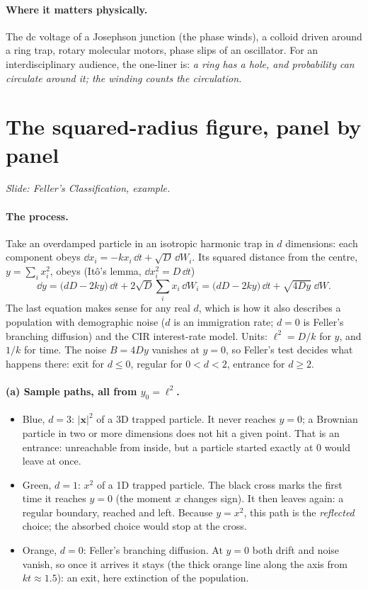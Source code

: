 \documentclass[11pt]{article}
\begin{document}
\paragraph{Where it matters physically.} The dc voltage of a Josephson junction (the phase winds), a colloid driven
around a ring trap, rotary molecular motors, phase slips of an oscillator. For an interdisciplinary audience, the
one-liner is: \emph{a ring has a hole, and probability can circulate around it; the winding counts the circulation.}

\section{The squared-radius figure, panel by panel}
\emph{Slide: Feller's Classification, example.}

\paragraph{The process.} Take an overdamped particle in an isotropic harmonic trap in $d$ dimensions: each component obeys
$\dd x_i=-kx_i\,\dd t+\sqrt D\,\dd W_i$. Its squared distance from the centre, $y=\sum_ix_i^2$, obeys (It\^o's lemma,
$\dd x_i^2=D\,\dd t$)
\[
  \dd y=\bigl(dD-2ky\bigr)\,\dd t+2\sqrt D\sum_ix_i\,\dd W_i=\bigl(dD-2ky\bigr)\,\dd t+\sqrt{4Dy}\;\dd W .
\]
The last equation makes sense for any real $d$, which is how it also describes a population with demographic noise
($d$ is an immigration rate; $d=0$ is Feller's branching diffusion) and the CIR interest-rate model. Units:
$\ell^2=D/k$ for $y$, and $1/k$ for time. The noise $B=4Dy$ vanishes at $y=0$, so Feller's test decides what happens
there: exit for $d\le0$, regular for $0<d<2$, entrance for $d\ge2$.

\paragraph{(a) Sample paths, all from $y_0=\ell^2$.}
\begin{itemize}
  \item Blue, $d=3$: $|\bm x|^2$ of a 3D trapped particle. It never reaches $y=0$; a Brownian particle in two or more
        dimensions does not hit a given point. That is an entrance: unreachable from inside, but a particle started
        exactly at $0$ would leave at once.
  \item Green, $d=1$: $x^2$ of a 1D trapped particle. The black cross marks the first time it reaches $y=0$ (the moment $x$
        changes sign). It then leaves again: a regular boundary, reached and left. Because $y=x^2$, this path is the
        \emph{reflected} choice; the absorbed choice would stop at the cross.
  \item Orange, $d=0$: Feller's branching diffusion. At $y=0$ both drift and noise vanish, so once it arrives it stays
        (the thick orange line along the axis from $kt\approx1.5$): an exit, here extinction of the population.
\end{itemize}
\end{document}
